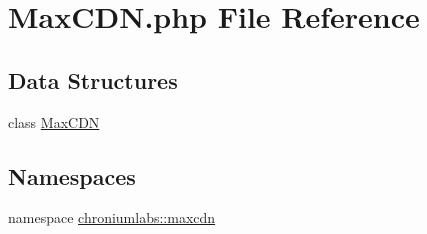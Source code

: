\hypertarget{_max_c_d_n_8php}{
\section{MaxCDN.php File Reference}
\label{_max_c_d_n_8php}
}
\subsection*{Data Structures}
\begin{DoxyCompactItemize}
\item 
class \hyperlink{class_max_c_d_n}{MaxCDN}
\end{DoxyCompactItemize}
\subsection*{Namespaces}
\begin{DoxyCompactItemize}
\item 
namespace \hyperlink{namespacechroniumlabs_1_1maxcdn}{chroniumlabs::maxcdn}
\end{DoxyCompactItemize}
